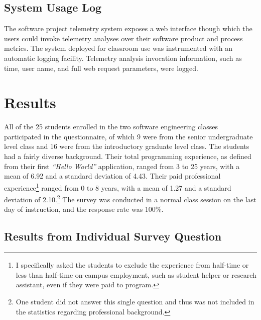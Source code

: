 \subsection{System Usage Log} \label{EvaluationInClassroom:InvocationLog}

The software project telemetry system exposes a web interface though which the users could invoke telemetry analyses over their software product and process metrics. The system deployed for classroom use was instrumented with an automatic logging facility. Telemetry analysis invocation information, such as time, user name, and full web request parameters, were logged.









\clearpage
\section{Results} \label{EvaluationInClassroom:Results}

All of the 25 students enrolled in the two software engineering classes participated in the questionnaire, of which 9 were from the senior undergraduate level class and 16 were from the introductory graduate level class. The students had a fairly diverse background. Their total programming experience, as defined from their first \textit{``Hello World''} application, ranged from 3 to 25 years, with a mean of 6.92 and a standard deviation of 4.43. Their paid professional experience\footnote{I specifically asked the students to exclude the experience from half-time or less than half-time on-campus employment, such as student helper or research assistant, even if they were paid to program.} ranged from 0 to 8 years, with a mean of 1.27 and a standard deviation of 2.10.\footnote{One student did not answer this single question and thus was not included in the statistics regarding professional background.} The survey was conducted in a normal class session on the last day of instruction, and the response rate was 100\%.


\subsection{Results from Individual Survey Question}

